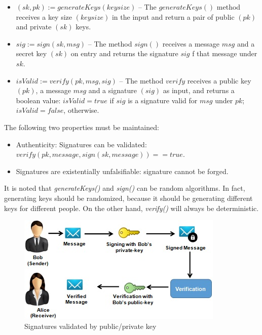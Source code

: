 \begin{itemize}
\item $(sk , pk) := generateKeys(keysize)$ – The $generateKeys()$ method receives a key size $(keysize)$ in the input and return a pair of public $(pk)$ and private $(sk)$ keys.
\item $sig := sign(sk , msg)$ – The method $sign()$ receives a message $msg$ and a secret key $(sk)$ on entry and returns the signature $sig$ f that message under $sk$.
\item $isValid := veri f y(pk , msg , sig)$ – The method $verify$ receives a public key $(pk)$, a message $msg$ and a signature $(sig)$ as input, and returns a boolean value: $isValid = true$ if $sig$ is a signature valid for $msg$ under $pk$; $isValid = false$, otherwise.
\end{itemize}

The following two properties must be maintained:

\begin{itemize}
\item Authenticity: Signatures can be validated: \\ $verify(pk, message, sign(sk, message)) = = true$.
\item Signatures are existentially unfalsifiable: signature cannot be forged.
\end{itemize}

It is noted that \textit{generateKeys()} and \textit{sign()} can be random algorithms. In fact, generating keys should be randomized, because it should be generating different keys for different people. On the other hand, \textit{verify()} will always be deterministic.

\begin{figure}[htbp]
\begin{center}
  \includegraphics[scale=1.0]{images/AliceBob.jpg}
\caption{Signatures validated by public/private key}
\label{fig:authenticationExample}
\end{center}
\end{figure}

